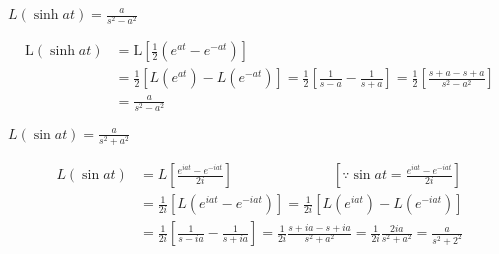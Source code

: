 \begin{exercise}
	$L(\sinh a t)=\frac{a}{s^{2}-a^{2}}$
\end{exercise}
\begin{answer}
	\begin{align*}
	\mathrm{L}(\sinh a t) &=\mathrm{L}\left[\frac{1}{2}\left(e^{a t}-e^{-a t}\right)\right] \\
	&=\frac{1}{2}\left[L\left(e^{a t}\right)-L\left(e^{-a t}\right)\right]=\frac{1}{2}\left[\frac{1}{s-a}-\frac{1}{s+a}\right]=\frac{1}{2}\left[\frac{s+a-s+a}{s^{2}-a^{2}}\right] \\
	&=\frac{a}{s^{2}-a^{2}}
	\end{align*}
\end{answer}
\begin{exercise}
	$L(\sin a t)=\frac{a}{s^{2}+a^{2}}$
\end{exercise}
\begin{answer}
	\begin{align*}
	L(\sin a t)&=L\left[\frac{e^{i a t}-e^{-i a t}}{2 i}\right]\hspace{3cm} \left[\because \sin a t=\frac{e^{i a t}-e^{-i a t}}{2 i}\right]\\
	&=\frac{1}{2 i}\left[L\left(e^{i a t}-e^{-i a t}\right)\right]=\frac{1}{2 i}\left[L\left(e^{i a t}\right)-L\left(e^{-i a t}\right)\right] \\
	&=\frac{1}{2 i}\left[\frac{1}{s-i a}-\frac{1}{s+i a}\right]=\frac{1}{2 i} \frac{s+i a-s+i a}{s^{2}+a^{2}}=\frac{1}{2 i} \frac{2 i a}{s^{2}+a^{2}}=\frac{a}{s^{2}+2^{2}}
	\end{align*}
\end{answer}









